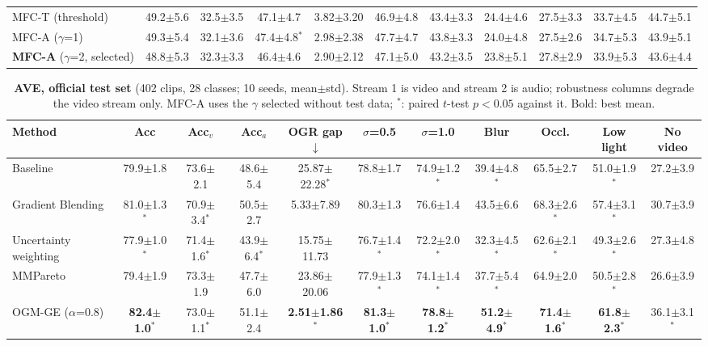 \documentclass[fleqn,10pt]{wlscirep}
\newcommand{\pmm}{$\pm$} %
\begin{document}
\begin{table}[t]
\begin{tabular}{@{}lcccccccccc@{}}
MFC-T (threshold) & 49.2$\pm$5.6 & 32.5$\pm$3.5 & 47.1$\pm$4.7 & 3.82$\pm$3.20 & 46.9$\pm$4.8 & 43.4$\pm$3.3 & 24.4$\pm$4.6 & 27.5$\pm$3.3 & 33.7$\pm$4.5 & 44.7$\pm$5.1 \\
MFC-A ($\gamma$=1) & 49.3$\pm$5.4 & 32.1$\pm$3.6 & 47.4$\pm$4.8$^{*}$ & 2.98$\pm$2.38 & 47.7$\pm$4.7 & 43.8$\pm$3.3 & 24.0$\pm$4.8 & 27.5$\pm$2.6 & 34.7$\pm$5.3 & 43.9$\pm$5.1 \\
\textbf{MFC-A} ($\gamma$=2, selected) & 48.8$\pm$5.3 & 32.3$\pm$3.3 & 46.4$\pm$4.6 & 2.90$\pm$2.12 & 47.1$\pm$5.0 & 43.2$\pm$3.5 & 23.8$\pm$5.1 & 27.8$\pm$2.9 & 33.9$\pm$5.3 & 43.6$\pm$4.4 \\
\bottomrule
\end{tabular}
\end{table}

\begin{table}[t]
\caption{\textbf{AVE, official test set} (402 clips, 28 classes; 10 seeds, mean\pmm std). Stream 1 is video and stream 2 is audio; robustness columns degrade the video stream only. MFC-A uses the $\gamma$ selected without test data; $^{*}$: paired $t$-test $p<0.05$ against it. Bold: best mean.}
\label{tab:main_ave}
\centering
\footnotesize
\setlength{\tabcolsep}{3pt}
\begin{tabular}{@{}lcccccccccc@{}}
\toprule
\textbf{Method} & \textbf{Acc} & \textbf{Acc$_v$} & \textbf{Acc$_a$} & \textbf{OGR gap}$\downarrow$ & \textbf{$\sigma$=0.5} & \textbf{$\sigma$=1.0} & \textbf{Blur} & \textbf{Occl.} & \textbf{Low light} & \textbf{No video} \\ \midrule
Baseline & 79.9$\pm$1.8 & 73.6$\pm$2.1 & 48.6$\pm$5.4 & 25.87$\pm$22.28$^{*}$ & 78.8$\pm$1.7 & 74.9$\pm$1.2$^{*}$ & 39.4$\pm$4.8$^{*}$ & 65.5$\pm$2.7 & 51.0$\pm$1.9$^{*}$ & 27.2$\pm$3.9 \\
Gradient Blending & 81.0$\pm$1.3$^{*}$ & 70.9$\pm$3.4$^{*}$ & 50.5$\pm$2.7 & 5.33$\pm$7.89 & 80.3$\pm$1.3 & 76.6$\pm$1.4 & 43.5$\pm$6.6 & 68.3$\pm$2.6$^{*}$ & 57.4$\pm$3.1$^{*}$ & 30.7$\pm$3.9 \\
Uncertainty weighting & 77.9$\pm$1.0$^{*}$ & 71.4$\pm$1.6$^{*}$ & 43.9$\pm$6.4$^{*}$ & 15.75$\pm$11.73 & 76.7$\pm$1.4$^{*}$ & 72.2$\pm$2.0$^{*}$ & 32.3$\pm$4.5$^{*}$ & 62.6$\pm$2.1$^{*}$ & 49.3$\pm$2.6$^{*}$ & 27.3$\pm$4.8 \\
MMPareto & 79.4$\pm$1.9 & 73.3$\pm$1.9 & 47.7$\pm$6.0 & 23.86$\pm$20.06 & 77.9$\pm$1.3$^{*}$ & 74.1$\pm$1.4$^{*}$ & 37.7$\pm$5.4$^{*}$ & 64.9$\pm$2.0 & 50.5$\pm$2.8$^{*}$ & 26.6$\pm$3.9 \\
OGM-GE ($\alpha$=0.8) & \textbf{82.4$\pm$1.0$^{*}$} & 73.0$\pm$1.1$^{*}$ & 51.1$\pm$2.4 & \textbf{2.51$\pm$1.86$^{*}$} & \textbf{81.3$\pm$1.0$^{*}$} & \textbf{78.8$\pm$1.2$^{*}$} & \textbf{51.2$\pm$4.9$^{*}$} & \textbf{71.4$\pm$1.6$^{*}$} & \textbf{61.8$\pm$2.3$^{*}$} & 36.1$\pm$3.1$^{*}$ \\

\end{tabular}
\end{table}
\end{document}
